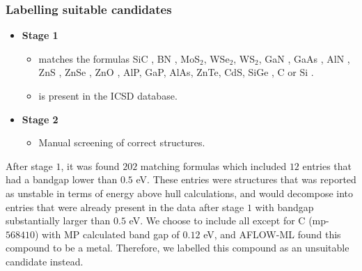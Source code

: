 
\subsubsection{Labelling suitable candidates}

\begin{itemize}
  \item[]{\textbf{Stage 1}}
  \begin{itemize}
  \item matches the formulas SiC \cite{Neudeck1995, Weber2010, Son2020, Falk2013, Martienssen2005}, BN \cite{Toth2019, Atatuere2018}, MoS$_2$\cite{Atatuere2018}, WSe$_2$\cite{Atatuere2018}, WS$_2$\cite{Atatuere2018}, GaN \cite{Berhane2018}, GaAs \cite{Wang2014}, AlN \cite{Weber2010, Xue2020}, ZnS \cite{Zhang2020}, ZnSe \cite{Weber2010}, ZnO \cite{Zhang2020}, AlP\cite{Weber2010}, GaP\cite{Weber2010}, AlAs\cite{Weber2010}, ZnTe\cite{Weber2010}, CdS\cite{Weber2010}, SiGe \cite{Hardy2019}, C \cite{Taylor2008, Barclay2011, Gordon2013} or Si \cite{Redjem2020, Zhang2020}.
  \item is present in the ICSD database.
  \end{itemize}
  \item[]{\textbf{Stage 2}}
  \begin{itemize}
  \item Manual screening of correct structures.
  \end{itemize}
\end{itemize}

After stage $1$, it was found $202$ matching formulas which included $12$ entries that had a bandgap lower than $0.5$ eV. These entries were structures that was reported as unstable in terms of energy above hull calculations, and would decompose into entries that were already present in the data after stage $1$ with bandgap substantially larger than $0.5$ eV. We choose to include all except for C (mp-$568410$) \cite{mp-568410} with MP calculated band gap of $0.12$ eV, and AFLOW-ML found this compound to be a metal. Therefore, we labelled this compound as an unsuitable candidate instead.

